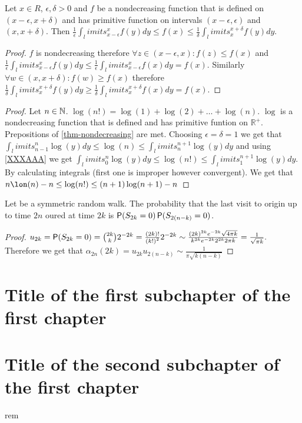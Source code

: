 \begin{lemma}\label{thm-nondecreasing}
  Let $x \in R$, $\epsilon, \delta>0$ and $f$ be a nondecreasing function that is defined on $(x-\epsilon, x+\delta)$ and has primitive function on intervals $(x-\epsilon, \epsilon)$ and $(x,x+\delta).$ Then $\frac{1}{\epsilon}\int_limits_{x-\epsilon}^x f(y) dy\leq f(x)\leq \frac{1}{\delta}\int_limits_{x}^{x+\delta} f(y) dy$.
\end{lemma}
\begin{proof}
  $f$ is nondecreasing therefore $\forall z \in (x-\epsilon, x): f(z)\leq f(x)$ and $\frac{1}{\epsilon}\int_limits_{x-\epsilon}^x f(y) dy\leq \frac{1}{\epsilon}\int_limits_{x-\epsilon}^x f(x) dy =f(x)$. Similarly $\forall w \in (x, x+\delta): f(w)\geq f(x)$ therefore $\frac{1}{\delta}\int_limits_{x}^{x+\delta} f(y) dy \geq \frac{1}{\delta}\int_limits_{x}^{x+\delta} f(x) dy=f(x).$
\end{proof}
\begin{lemma}[Stirling's approximation formula]
  $n!\sim \left(\frac{n}{e}\right)^n}\sqrt{2\pi n}$ as $n \to \pinf$ which means that
  $\lim_\limits_{n \to \pinf}\frac{n!}{\left(\frac{n}{e}\right)^n}\sqrt{2\pi n}=1$.
\end{lemma}
\begin{proof}%
  Let $n \in \N$. \label{XXXAAA}$\log(n!)=\log(1)+\log(2)+\ldots +\log(n)$. $\log$ is a nondecreasing function that is defined and has primitive funtion on $\mathbb{R}^+$. Prepositions of \ref{thm-nondecreasing} are met. Choosing $\epsilon=\delta=1$ we get that $\int_limits_{n-1}^n \log(y) dy\leq \log(n)\leq \int_limits_{n}^{n+1} \log(y) dy$ and using \ref{XXXAAA} we get $\int_limits_{0}^n \log(y) dy\leq \log(n!)\leq \int_limits_{1}^{n+1} \log(y) dy$. By calculating integrals (first one is improper however convergent). We get that $n\lon(n)-n\leq \log(n!) \leq (n+1)\log(n+1)-n$
\end{proof}
\begin{thm}
  Let \rw be a symmetric random walk. The probability that the last visit to origin up to time $2n$ oured at time $2k$ is $\pr(S_{2k}=0)\pr(S_{2(n-k)}=0)$.
\end{thm}
\begin{proof}
  $u_{2k}=\pr(S_{2k}=0)=\binom{2k}{k}2^{-2k}=\frac{(2k)!}{\left( k!\right)^2}2^{-2k}\sim \frac{(2k)^{2k}e^{-2k}\sqrt{4\pi k}}{k^{2k}e^{-2k}2^{2k}2\pi k}=\frac{1}{\sqrt{\pi k}}.$ Therefore we get that $\alpha_{2n}(2k)=u_{2k}u_{2(n-k)}\sim \frac{1}{\pi \sqrt{k(n-k)}}$
\end{proof}


\section{Title of the first subchapter of the first chapter}

\section{Title of the second subchapter of the first chapter}
rem
